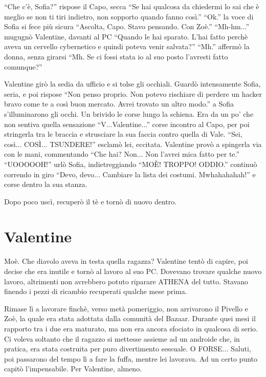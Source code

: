     ``Che c'è, Sofia?'' rispose il Capo, secca ``Se hai qualcosa da chiedermi lo sai che è meglio se non ti tiri
    indietro, non sopporto quando fanno così.'' ``Ok.'' la voce di Sofia si fece più sicura ``Ascolta, Capo. Stavo
    pensando. Con Zoè.'' ``Mh-hm...'' mugugnò Valentine, davanti al PC ``Quando le hai sparato. L'hai fatto perchè aveva
    un cervello cybernetico e quindi poteva venir salvata?'' ``Mh.'' affermò la donna, senza girarsi ``Mh. Se ci fossi
    stata io al suo posto l'avresti fatto comunque?''

    Valentine girò la sedia da ufficio e si tolse gli occhiali. Guardò intensamente Sofia, seria, e poi rispose ``Non
    penso proprio. Non potevo rischiare di perdere un hacker bravo come te a così buon mercato. Avrei trovato un altro
    modo.'' a Sofia s'illuminarono gli occhi. Un brivido le corse lungo la schiena. Era da un po' che non sentiva quella
    sensazione ``V...Valentine...'' corse incontro al Capo, per poi stringerla tra le braccia e strusciare la sua faccia
    contro quella di Vale. ``Sei, così... COSÌ... TSUNDERE!'' esclamò lei, eccitata. Valentine provò a spingerla via con
    le mani, commentando ``Che hai? Non... Non l'avrei mica fatto per te.'' ``UOOOOOH!'' urlò Sofia, indietreggiando
    ``MOÈ! TROPPO! ODDIO.'' continuò correndo in giro ``Devo, devo... Cambiare la lista dei costumi. Mwhahahahah!'' e
    corse dentro la sua stanza.

    Dopo poco uscì, recuperò il tè e tornò di nuovo dentro.

  \section*{Valentine}

    Moè. Che diavolo aveva in testa quella ragazza? Valentine tentò di capire, poi decise che era inutile e tornò al
    lavoro al suo PC. Dovevano trovare qualche nuovo lavoro, altrimenti non avrebbero potuto riparare ATHENA del tutto.
    Stavano finendo i pezzi di ricambio recuperati qualche mese prima.

    Rimase lì a lavorare finchè, verso metà pomeriggio, non arrivarono il Pivello e Zoè, la quale era stata adottata
    dalla comunità del Bazaar. Durante quei mesi il rapporto
    tra i due era maturato, ma non era ancora sfociato in qualcosa di serio. Ci voleva soltanto che il ragazzo si
    mettesse assieme ad un androide che, in pratica, era stata costruita per puro divertimento sessuale. O FORSE...
    Saluti, poi passarono del tempo lì a fare la fuffa, mentre lei lavorava. Ad un certo punto capitò l'impensabile. Per
    Valentine, almeno.

